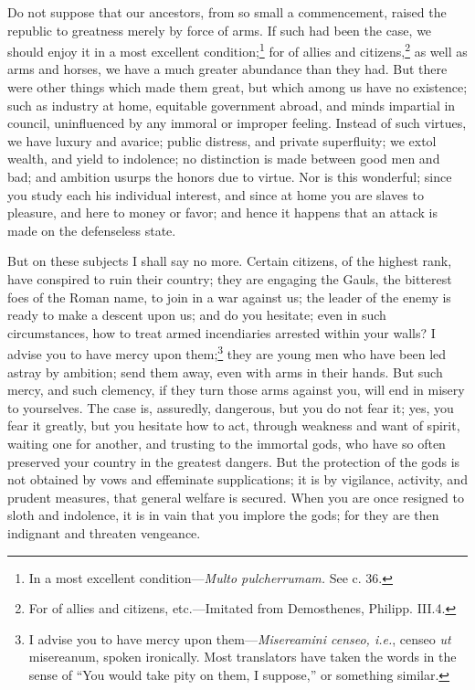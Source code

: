 Do not suppose that our ancestors, from so small a commencement,
raised the republic to greatness merely by force of arms. If such had
been the case, we should enjoy it in a most excellent condition;\footnote{In a most excellent condition—\emph{Multo pulcherrumam.} See c. 36.}
for of allies and citizens,\footnote{For of allies and citizens, etc.—Imitated from Demosthenes,
Philipp. III.4.} as well as arms and horses, we have a
much greater abundance than they had. But there were other things
which made them great, but which among us have no existence; such as
industry at home, equitable government abroad, and minds impartial in
council, uninfluenced by any immoral or improper feeling. Instead of
such virtues, we have luxury and avarice; public distress, and private
superfluity; we extol wealth, and yield to indolence; no distinction
is made between good men and bad; and ambition usurps the honors due
to virtue. Nor is this wonderful; since you study each his individual
interest, and since at home you are slaves to pleasure, and here to
money or favor; and hence it happens that an attack is made on the
defenseless state.

But on these subjects I shall say no more. Certain citizens, of the
highest rank, have conspired to ruin their country; they are engaging
the Gauls, the bitterest foes of the Roman name, to join in a war
against us; the leader of the enemy is ready to make a descent upon
us; and do you hesitate; even in such circumstances, how to treat
armed incendiaries arrested within your walls? I advise you to have
mercy upon them;\footnote{I advise you to have mercy upon them—\emph{Misereamini censeo,
i.e.}, censeo \emph{ut} misereanum, spoken ironically. Most translators
have taken the words in the sense of ``You would take pity on them, I
suppose,'' or something similar.} they are young men who have been led astray by
ambition; send them away, even with arms in their hands. But such
mercy, and such clemency, if they turn those arms against you, will
end in misery to yourselves. The case is, assuredly, dangerous, but
you do not fear it; yes, you fear it greatly, but you hesitate how to
act, through weakness and want of spirit, waiting one for another, and
trusting to the immortal gods, who have so often preserved your
country in the greatest dangers. But the protection of the gods is not
obtained by vows and effeminate supplications; it is by vigilance,
activity, and prudent measures, that general welfare is secured. When
you are once resigned to sloth and indolence, it is in vain that you
implore the gods; for they are then indignant and threaten vengeance.

